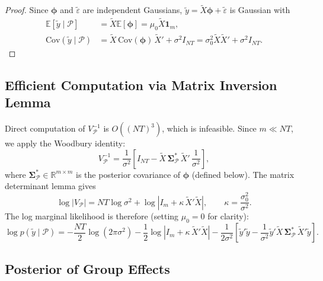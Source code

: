 \documentclass[12pt]{article}
\newcommand{\R}{\mathbb{R}}
\newcommand{\E}{\mathbb{E}}
\newcommand{\1}{\mathbbm{1}}
\newcommand{\ytd}{\tilde{y}}
\newcommand{\epstd}{\tilde{\varepsilon}}
\newcommand{\Xtd}{\tilde{X}}
\begin{document}
\begin{proof}
  Since $\bm{\phi}$ and $\epstd$ are independent Gaussians,
  $\ytd = \Xtd\bm{\phi} + \epstd$ is Gaussian with
  \begin{align*}
    \E[\ytd\mid\mathcal{P}] &= \Xtd\E[\bm{\phi}] = \mu_0\Xtd\mathbf{1}_m, \\
    \mathrm{Cov}(\ytd\mid\mathcal{P}) &= \Xtd\,\mathrm{Cov}(\bm{\phi})\,\Xtd' + \sigma^2 I_{NT}
      = \sigma_0^2\Xtd\Xtd' + \sigma^2 I_{NT}.
  \end{align*}
\end{proof}

\subsection{Efficient Computation via Matrix Inversion Lemma}

Direct computation of $V_{\mathcal{P}}^{-1}$ is $O((NT)^3)$, which is
infeasible. Since $m\ll NT$, we apply the Woodbury identity:
\begin{equation}
  V_{\mathcal{P}}^{-1} = \frac{1}{\sigma^2}\left[I_{NT} - \Xtd\,\bm{\Sigma}_{\mathcal{P}}^*\,\Xtd'\,\frac{1}{\sigma^2}\right],
\end{equation}
where $\bm{\Sigma}_{\mathcal{P}}^*\in\R^{m\times m}$ is the posterior
covariance of $\bm{\phi}$ (defined below). The matrix determinant lemma gives
\begin{equation}
  \log|V_{\mathcal{P}}| = NT\log\sigma^2 + \log\left|I_m + \kappa\,\Xtd'\Xtd\right|,
  \qquad \kappa = \frac{\sigma_0^2}{\sigma^2}.
\end{equation}
The log marginal likelihood is therefore (setting $\mu_0 = 0$ for clarity):
\begin{equation}
  \log p(\ytd\mid\mathcal{P}) = -\frac{NT}{2}\log(2\pi\sigma^2)
    - \frac{1}{2}\log\left|I_m + \kappa\,\Xtd'\Xtd\right|
    - \frac{1}{2\sigma^2}\left[\ytd'\ytd - \frac{1}{\sigma^2}\ytd'\Xtd\,\bm{\Sigma}_{\mathcal{P}}^*\,\Xtd'\ytd\right].
    \label{eq:logml}
\end{equation}

\subsection{Posterior of Group Effects}
\end{document}
